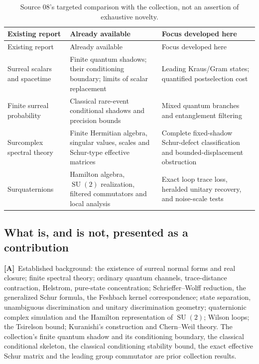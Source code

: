 \documentclass[11pt,oneside]{article}
\numberwithin{equation}{section}
\theoremstyle{plain}
\theoremstyle{definition}
\theoremstyle{remark}
\DeclareMathOperator{\SU}{SU}
\newcommand{\TA}{\textcolor{TierA}{\textsf{\bfseries[A]}}}
\begin{document}
\begin{longtable}{@{}L{0.22\textwidth}L{0.36\textwidth}L{0.34\textwidth}@{}}
\caption{Source 08's targeted comparison with the collection, not an assertion of exhaustive novelty.}\label{qgs:ops:tab:overlap}\\
\toprule
Existing report & Already available & Focus developed here\\
\midrule
\endfirsthead
\toprule
Existing report & Already available & Focus developed here\\
\midrule
\endhead
\bottomrule
\endfoot
Surreal scalars and spacetime \cite{repoPhysics}
 & Finite quantum shadows; their conditioning boundary; limits of scalar replacement
 & Leading Kraus/Gram states; quantified postselection cost\\[3pt]
Finite surreal probability \cite{repoProbability}
 & Classical rare-event conditional shadows and precision bounds
 & Mixed quantum branches and entanglement filtering\\[3pt]
Surcomplex spectral theory \cite{repoSpectral}
 & Finite Hermitian algebra, singular values, scales and Schur-type effective matrices
 & Complete fixed-shadow Schur-defect classification and bounded-displacement obstruction\\[3pt]
Surquaternions \cite{repoQuaternion}
 & Hamilton algebra, $\SU(2)$ realization, filtered commutators and local analysis
 & Exact loop trace loss, heralded unitary recovery, and noise-scale tests\\
\end{longtable}

\subsection{What is, and is not, presented as a contribution}
\TA\ Established background: the existence of surreal normal forms and real closure; finite spectral theory; ordinary quantum channels, trace-distance contraction, Helstrom, pure-state concentration; Schrieffer--Wolff reduction, the generalized Schur formula, the Feshbach kernel correspondence; state separation, unambiguous discrimination and unitary discrimination geometry; quaternionic complex simulation and the Hamilton representation of $\SU(2)$; Wilson loops; the Tsirelson bound; Kuranishi's construction and Chern--Weil theory. The collection's finite quantum shadow and its conditioning boundary, the classical conditional skeleton, the classical conditioning stability bound, the exact effective Schur matrix and the leading group commutator are prior collection results.
\end{document}

